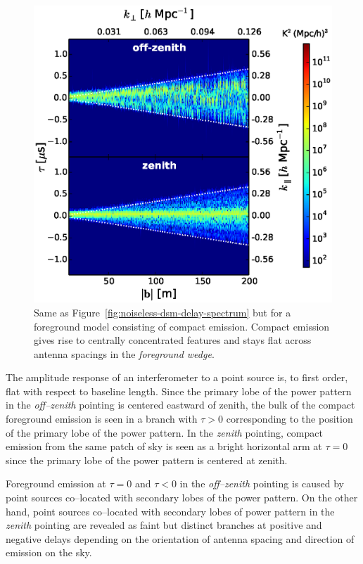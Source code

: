 \documentclass[preprint2,iop,numberedappendix]{emulateapj}
\begin{document}
\begin{figure}[htb]
\centering
\includegraphics[width=\linewidth]{fig10.eps}
\caption{Same as Figure~\ref{fig:noiseless-dsm-delay-spectrum} but for a foreground model consisting of compact emission. Compact emission gives rise to centrally concentrated features and stays flat across antenna spacings in the {\it foreground wedge}.\label{fig:noiseless-csm-delay-spectrum}}
\end{figure}

The amplitude response of an interferometer to a point source is, to first order, flat with respect to baseline length. Since the primary lobe of the power pattern in the {\it off--zenith} pointing is centered eastward of zenith, the bulk of the compact foreground emission is seen in a branch with $\tau>0$ corresponding to the position of the primary lobe of the power pattern. In the {\it zenith} pointing, compact emission from the same patch of sky is seen as a bright horizontal arm at $\tau=0$ since the primary lobe of the power pattern is centered at zenith. 

Foreground emission at $\tau=0$ and $\tau<0$ in the {\it off--zenith} pointing is caused by point sources co--located with secondary lobes of the power pattern. On the other hand, point sources co--located with secondary lobes of power pattern in the {\it zenith} pointing are revealed as faint but distinct branches at positive and negative delays depending on the orientation of antenna spacing and direction of emission on the sky. 
\end{document}
